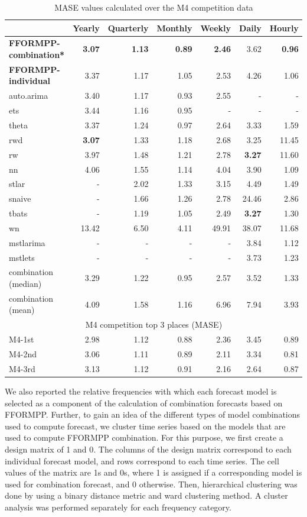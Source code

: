 \documentclass[11pt,a4paper,]{article}
\begin{document}
\begin{table}[!h]
\caption{MASE values calculated over the M4 competition data}
\centering\scriptsize\tabcolsep=0.12cm
\label{forecast}
\begin{tabular}{l|rrrrrr}
 & Yearly & Quarterly & Monthly & Weekly & Daily & Hourly \\\hline
\bf{FFORMPP-combination*} & \bf{3.07} &  \bf{1.13}& \bf{0.89} & \bf{2.46} & 3.62 & \bf{0.96} \\
\bf{FFORMPP-individual} & 3.37 &  1.17&  1.05&  2.53& 4.26 &  1.06\\
auto.arima & 3.40 &1.17  &0.93  & 2.55 &  -& - \\
ets & 3.44 &  1.16& 0.95 &  -&-  &  -\\
theta & 3.37 &1.24  & 0.97 &2.64  & 3.33 & 1.59 \\
rwd & \bf{3.07} & 1.33 & 1.18  & 2.68  & 3.25 & 11.45 \\
rw & 3.97 & 1.48 & 1.21  &2.78  & \bf{3.27} & 11.60 \\
nn & 4.06 & 1.55 &  1.14 &4.04 & 3.90 & 1.09 \\
stlar & - & 2.02 &  1.33& 3.15 & 4.49 & 1.49 \\
snaive & - &  1.66& 1.26 &  2.78& 24.46 & 2.86 \\
tbats & - & 1.19 &  1.05& 2.49 & \bf{3.27} &  1.30\\
wn & 13.42 &  6.50&  4.11&  49.91& 38.07 & 11.68 \\
mstlarima & - & - &  - & - & 3.84 &  1.12\\
mstlets & - &  - &  - &  - & 3.73 &  1.23\\
combination (median) & 3.29 & 1.22 &  0.95& 2.57 & 3.52 & 1.33\\
combination (mean) & 4.09 & 1.58 &  1.16&6.96  & 7.94 & 3.93 \\\hline
\multicolumn{7}{c}{M4 competition top 3 places (MASE)} \\\hline
M4-1st & 2.98 & 1.12 &  0.88& 2.36 & 3.45 & 0.89\\
M4-2nd & 3.06 & 1.11 &  0.89& 2.11 & 3.34 & 0.81\\
M4-3rd & 3.13 & 1.12 &  0.91& 2.16 & 2.64 & 0.87\\\hline
\end{tabular}
\end{table}

We also reported the relative frequencies with which each forecast model is selected as a component of the calculation of combination forecasts based on FFORMPP. Further, to gain an idea of the different types of model combinations used to compute forecast, we cluster time series based on the models that are used to compute FFORMPP combination. For this purpose, we first create a design matrix of 1 and 0. The columns of the design matrix correspond to each individual forecast model, and rows correspond to each time series. The cell values of the matrix are 1s and 0s, where 1 is assigned if a corresponding model is used for combination forecast, and 0 otherwise. Then, hierarchical clustering was done by using a binary distance metric and ward clustering method. A cluster analysis was performed separately for each frequency category.
\end{document}
